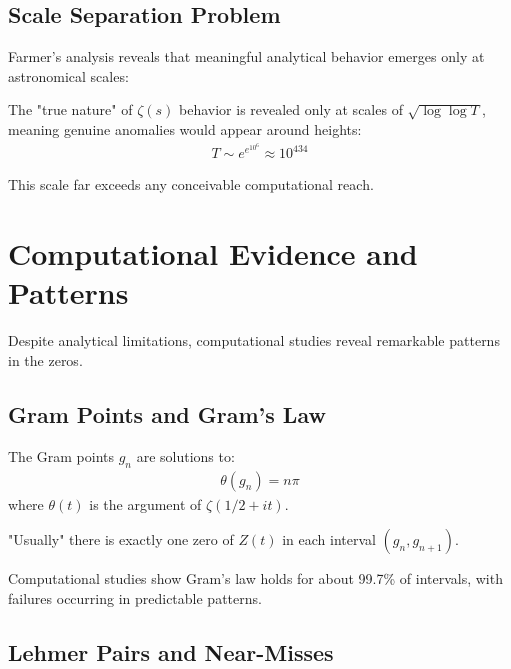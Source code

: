 \subsection{Scale Separation Problem}

Farmer's analysis \cite{farmer2022} reveals that meaningful analytical behavior emerges only at astronomical scales:

\begin{theorem}
The "true nature" of $\zeta(s)$ behavior is revealed only at scales of $\sqrt{\log\log T}$, meaning genuine anomalies would appear around heights:
\begin{align}
T \sim e^{e^{10^6}} \approx 10^{434}
\end{align}
\end{theorem}

This scale far exceeds any conceivable computational reach.

\section{Computational Evidence and Patterns}
\label{sec:evidence-patterns}

Despite analytical limitations, computational studies reveal remarkable patterns in the zeros.

\subsection{Gram Points and Gram's Law}

\begin{definition}
The Gram points $g_n$ are solutions to:
\begin{align}
\theta(g_n) = n\pi
\end{align}
where $\theta(t)$ is the argument of $\zeta(1/2 + it)$.
\end{definition}

\begin{theorem}
"Usually" there is exactly one zero of $Z(t)$ in each interval $(g_n, g_{n+1})$.
\end{theorem}

Computational studies show Gram's law holds for about 99.7\% of intervals, with failures occurring in predictable patterns.

\subsection{Lehmer Pairs and Near-Misses}

